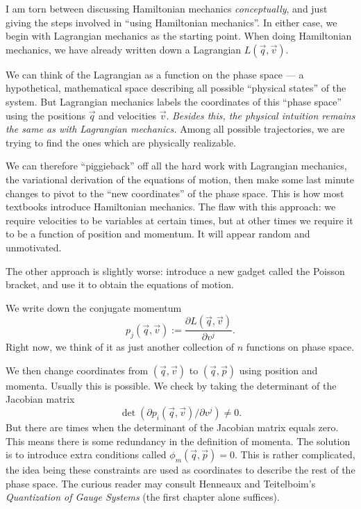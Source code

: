 \M
I am torn between discussing Hamiltonian mechanics \emph{conceptually},
and just giving the steps involved in ``using Hamiltonian mechanics''.
In either case, we begin with Lagrangian mechanics as the starting
point. When doing Hamiltonian mechanics, we have already written down a
Lagrangian $L(\vec{q},\vec{v})$.

We can think of the Lagrangian as a function on the phase space --- a
hypothetical, mathematical space describing all possible ``physical
states'' of the system. But Lagrangian mechanics labels the coordinates
of this ``phase space'' using the positions $\vec{q}$ and velocities $\vec{v}$.
\emph{Besides this, the physical intuition remains the same as with Lagrangian mechanics.}
Among all possible trajectories, we are trying to find the ones which
are physically realizable.

We can therefore ``piggieback'' off all the hard work with Lagrangian
mechanics, the variational derivation of the equations of motion, then
make some last minute changes to pivot to the ``new coordinates'' of the
phase space. This is how most textbooks introduce Hamiltonian mechanics.
The flaw with this approach: we require velocities to be variables at
certain times, but at other times we require it to be a function of
position and momentum. It will appear random and unmotivated.

The other approach is slightly worse: introduce a new gadget called the
Poisson bracket, and use it to obtain the equations of motion.

We write down the conjugate momentum
\begin{equation}
p_{j}(\vec{q},\vec{v}) := \frac{\partial L(\vec{q},\vec{v})}{\partial v^{j}}.
\end{equation}
Right now, we think of it as just another collection of $n$ functions on
phase space.

We then change coordinates from $(\vec{q},\vec{v})$ to
$(\vec{q},\vec{p})$ using position and momenta. Usually this is
possible. We check by taking the determinant of the Jacobian matrix
\begin{equation}
\det(\partial p_{i}(\vec{q},\vec{v})/\partial v^{j})\neq0.
\end{equation}
But there are times when the determinant of the Jacobian matrix equals
zero. This means there is some redundancy in the definition of momenta.
The solution is to introduce extra conditions called 
$\phi_{m}(\vec{q},\vec{p})=0$. This is rather complicated, the idea
being these constraints are used as coordinates to describe the rest of
the phase space. The curious reader may consult Henneaux and
Teitelboim's \emph{Quantization of Gauge Systems} (the first chapter
alone suffices).

